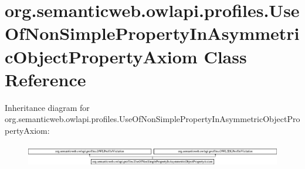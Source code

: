 \hypertarget{classorg_1_1semanticweb_1_1owlapi_1_1profiles_1_1_use_of_non_simple_property_in_asymmetric_object_property_axiom}{\section{org.\-semanticweb.\-owlapi.\-profiles.\-Use\-Of\-Non\-Simple\-Property\-In\-Asymmetric\-Object\-Property\-Axiom Class Reference}
\label{classorg_1_1semanticweb_1_1owlapi_1_1profiles_1_1_use_of_non_simple_property_in_asymmetric_object_property_axiom}
}
Inheritance diagram for org.\-semanticweb.\-owlapi.\-profiles.\-Use\-Of\-Non\-Simple\-Property\-In\-Asymmetric\-Object\-Property\-Axiom\-:\begin{figure}[H]
\begin{center}
\leavevmode
\includegraphics[height=1.029412cm]{classorg_1_1semanticweb_1_1owlapi_1_1profiles_1_1_use_of_non_simple_property_in_asymmetric_object_property_axiom}
\end{center}
\end{figure}

